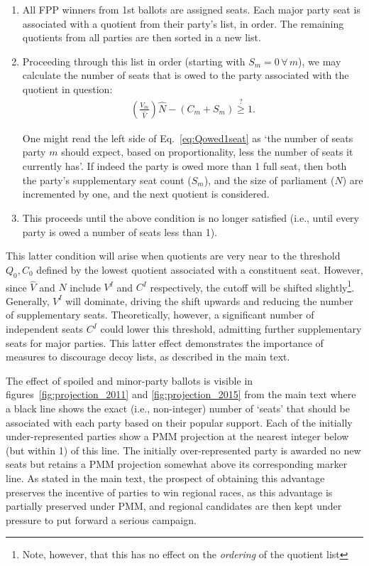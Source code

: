 \begin{enumerate}
\item All FPP winners from 1st ballots are assigned seats.
Each major party seat is associated with a quotient from their party's list, in order. The remaining quotients from all parties are then sorted in a new list.

\item Proceeding through this list in order (starting with $S_m=0 \, \forall \, m$), we may calculate the number of seats that is owed to the party associated with the quotient in question:
\begin{align}
\left(\frac{V_m}{\hat{V}}\right) \hat{N} -(C_m+S_m)\stackrel{?}{\ge} 1.
\label{eq:Qowed1seat}
\end{align}

One might read the left side of Eq.~\ref{eq:Qowed1seat} as `the number of seats party $m$ should expect, based on proportionality, less the number of seats it currently has'.
If indeed the party is owed more than 1 full seat, then both the party's supplementary seat count ($S_m$), and the size of parliament ($\hat{N}$) are incremented by one, and the next quotient is considered.

\item This proceeds until the above condition is no longer satisfied (i.e., until every party is owed a number of seats less than 1).
\end{enumerate}

This latter condition will arise when quotients are very near to the threshold $Q_0,C_0$ defined by the lowest quotient associated with a  constituent seat. However, since $\hat{V}$ and $\hat{N}$ include $V^I$ and $C^I$ respectively, the cutoff will be shifted slightly\footnote{Note, however, that this has no effect on the \emph{ordering} of the quotient list}.
Generally, $V^I$ will dominate, driving the shift upwards and reducing the number of supplementary seats.
Theoretically, however, a significant number of independent seats $C^I$ could lower this threshold, admitting further supplementary seats for major parties. 
This latter effect demonstrates the importance of measures to discourage decoy lists, as described in the main text.

The effect of spoiled and minor-party ballots is visible in figures~\ref{fig:projection_2011} and \ref{fig:projection_2015} from the main text where a black line shows the exact (i.e., non-integer) number of `seats' that should be associated with each party based on their popular support.
Each of the initially under-represented parties show a PMM projection at the nearest integer below (but within 1) of this line. The initially over-represented party is awarded no new seats but retains a PMM projection somewhat above its corresponding marker line.
As stated in the main text, the prospect of obtaining this advantage preserves the incentive of parties to win regional races, as this advantage is partially preserved under PMM, and regional candidates are then kept under pressure to put forward a serious campaign.

